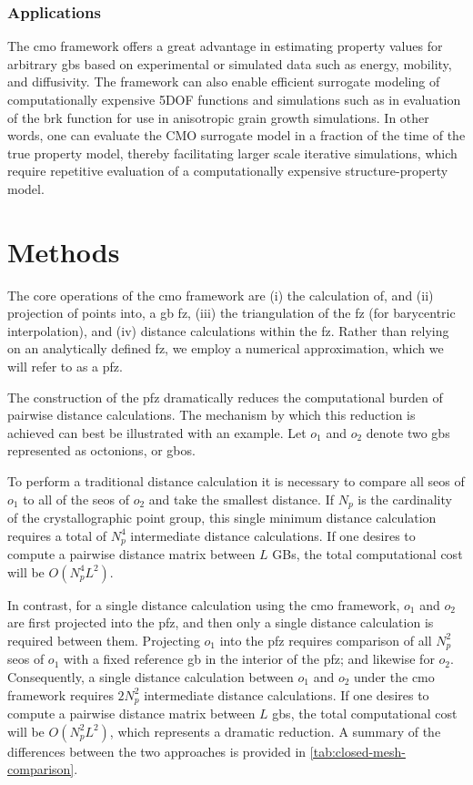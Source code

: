 \documentclass[preprint,12pt]{elsarticle}
\begin{document}
\subsubsection{Applications}

The \gls{cmo} framework offers a great advantage in estimating property values for arbitrary \glspl{gb} based on experimental or simulated data such as energy, mobility, and diffusivity. The framework can also enable efficient surrogate modeling of computationally expensive 5DOF functions and simulations such as in evaluation of the \gls{brk} function for use in anisotropic grain growth simulations. In other words, one can evaluate the CMO surrogate model in a fraction of the time of the true property model, thereby facilitating larger scale iterative simulations, which require repetitive evaluation of a computationally expensive structure-property model.

\section{Methods} \label{sec:methods}

The core operations of the \gls{cmo} framework are (i) the calculation of, and (ii) projection of points into, a \gls{gb} \gls{fz}, (iii) the triangulation of the \gls{fz} (for barycentric interpolation), and (iv) distance calculations within the \gls{fz}. Rather than relying on an analytically defined \gls{fz}, we employ a numerical approximation, which we will refer to as a \gls{pfz}.

The construction of the \gls{pfz} dramatically reduces the computational burden of pairwise distance calculations. The mechanism by which this reduction is achieved can best be illustrated with an example. Let $o_1$ and $o_2$ denote two \glspl{gb} represented as octonions, or \glspl{gbo}. 

To perform a traditional distance calculation it is necessary to compare all \glspl{seo} of $o_1$ to all of the \glspl{seo} of $o_2$ and take the smallest distance. If $N_p$ is the cardinality of the crystallographic point group, this single minimum distance calculation requires a total of $N_p^4$ intermediate distance calculations. If one desires to compute a pairwise distance matrix between $L$ GBs, the total computational cost will be $O(N_p^4L^2)$.

In contrast, for a single distance calculation using the \gls{cmo} framework, $o_1$ and $o_2$ are first projected into the \gls{pfz}, and then only a single distance calculation is required between them. Projecting $o_1$ into the \gls{pfz} requires comparison of all $N_p^2$ \glspl{seo} of $o_1$ with a fixed reference \gls{gb} in the interior of the \gls{pfz}; and likewise for $o_2$. Consequently, a single distance calculation between $o_1$ and $o_2$ under the \gls{cmo} framework requires $2N_p^2$ intermediate distance calculations. If one desires to compute a pairwise distance matrix between $L$ \glspl{gb}, the total computational cost will be $O(N_p^2L^2)$, which represents a dramatic reduction. A summary of the differences between the two approaches is provided in \cref{tab:closed-mesh-comparison}.
\end{document}
